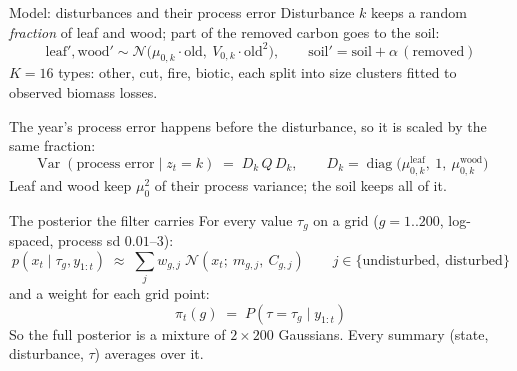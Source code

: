 \documentclass[aspectratio=169,12pt]{beamer}
\newcommand{\N}{\mathcal{N}}
\newcommand{\muted}[1]{{\color{black!55}#1}}
\begin{document}
\begin{frame}{Model: disturbances and their process error}
  Disturbance $k$ keeps a random \emph{fraction} of leaf and wood; part of the removed
  carbon goes to the soil:
  \[
    \text{leaf}', \text{wood}' \sim \N\!\big(\mu_{0,k}\cdot\text{old},\ V_{0,k}\cdot\text{old}^2\big),
    \qquad
    \text{soil}' = \text{soil} + \alpha\,(\text{removed})
  \]
  \muted{$K = 16$ types: other, cut, fire, biotic, each split into size clusters fitted to observed biomass losses.}
  \bigskip

  The year's process error happens before the disturbance, so it is scaled by the
  same fraction:
  \[
    \operatorname{Var}(\text{process error} \mid z_t = k) \;=\; D_k\, Q\, D_k,
    \qquad D_k = \operatorname{diag}\big(\mu_{0,k}^\text{leaf},\ 1,\ \mu_{0,k}^\text{wood}\big)
  \]
  \muted{Leaf and wood keep $\mu_0^2$ of their process variance; the soil keeps all of it.}
\end{frame}

\begin{frame}{The posterior the filter carries}
  For every value $\tau_g$ on a grid ($g = 1..200$, log-spaced, process sd $0.01$--$3$):
  \[
    p(x_t \mid \tau_g, y_{1:t}) \;\approx\; \sum_{j} w_{g,j}\; \N(x_t;\ m_{g,j},\ C_{g,j})
    \qquad j \in \{\text{undisturbed},\ \text{disturbed}\}
  \]
  and a weight for each grid point:
  \[
    \pi_t(g) \;=\; P(\tau = \tau_g \mid y_{1:t})
  \]
  \medskip
  So the full posterior is a mixture of $2 \times 200$ Gaussians.
  Every summary (state, disturbance, $\tau$) averages over it.
\end{frame}
\end{document}
